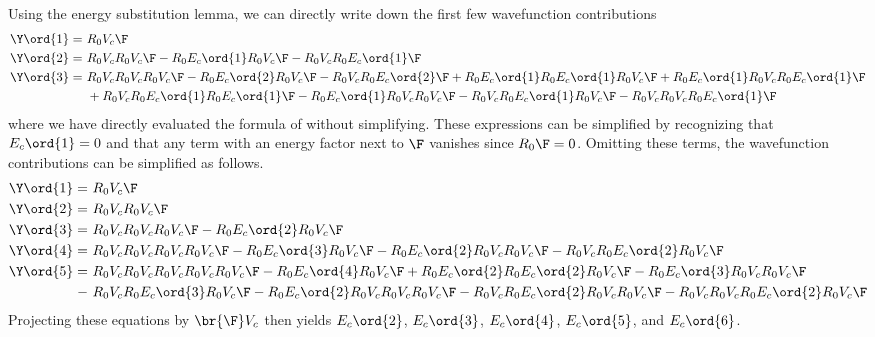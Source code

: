 \documentclass[11pt,fleqn]{article}
\numberwithin{equation}{section}
\begin{document}
\begin{ex}
Using the energy substitution lemma, we can directly write down the first few wavefunction contributions
\begin{align*}
  \Y\ord{1}
=&\
  R_0V_c\F
\\
  \Y\ord{2}
=&\
  R_0V_cR_0V_c\F
-
  R_0E_c\ord{1}R_0V_c\F
-
  R_0V_cR_0E_c\ord{1}\F
\\
  \Y\ord{3}
=&\
  R_0V_cR_0V_cR_0V_c\F
-
  R_0E_c\ord{2}R_0V_c\F
-
  R_0V_cR_0E_c\ord{2}\F
+
  R_0E_c\ord{1}R_0E_c\ord{1}R_0V_c\F
+
  R_0E_c\ord{1}R_0V_cR_0E_c\ord{1}\F
\\&\
+
  R_0V_cR_0E_c\ord{1}R_0E_c\ord{1}\F
-
  R_0E_c\ord{1}R_0V_cR_0V_c\F
-
  R_0V_cR_0E_c\ord{1}R_0V_c\F
-
  R_0V_cR_0V_cR_0E_c\ord{1}\F
\end{align*}
where we have directly evaluated the formula of  without simplifying.
These expressions can be simplified by recognizing that $E_c\ord{1}=0$ and that any term with an energy factor next to $\F$ vanishes since $R_0\F=0$.
Omitting these terms, the wavefunction contributions can be simplified as follows.
\begin{align*}
  \Y\ord{1}
=&\
  R_0V_c\F
\\
  \Y\ord{2}
=&\
  R_0V_cR_0V_c\F
\\
  \Y\ord{3}
=&\
  R_0V_cR_0V_cR_0V_c\F
-
  R_0E_c\ord{2}R_0V_c\F
\\
  \Y\ord{4}
=&\
  R_0V_cR_0V_cR_0V_cR_0V_c\F
-
  R_0E_c\ord{3}R_0V_c\F
-
  R_0E_c\ord{2}R_0V_cR_0V_c\F
-
  R_0V_cR_0E_c\ord{2}R_0V_c\F
\\
  \Y\ord{5}
=&\
  R_0V_cR_0V_cR_0V_cR_0V_cR_0V_c\F
-
  R_0E_c\ord{4}R_0V_c\F
+
  R_0E_c\ord{2}R_0E_c\ord{2}R_0V_c\F
-
  R_0E_c\ord{3}R_0V_cR_0V_c\F
\\-&\
  R_0V_cR_0E_c\ord{3}R_0V_c\F
-
  R_0E_c\ord{2}R_0V_cR_0V_cR_0V_c\F
-
  R_0V_cR_0E_c\ord{2}R_0V_cR_0V_c\F
-
  R_0V_cR_0V_cR_0E_c\ord{2}R_0V_c\F
\end{align*}
Projecting these equations by $\br{\F}V_c$ then yields $E_c\ord{2}$, $E_c\ord{3}$, $E_c\ord{4}$, $E_c\ord{5}$, and $E_c\ord{6}$.
\end{ex}
\end{document}
